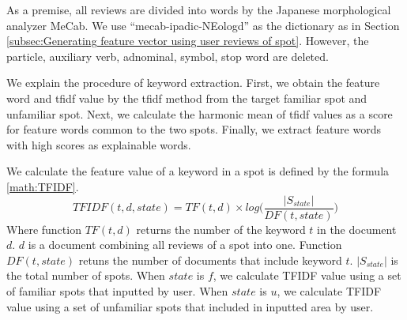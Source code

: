 \documentclass[journal]{IAENGtran}
\begin{document}
As a premise, all reviews are divided into words by the Japanese morphological analyzer MeCab. We use ``mecab-ipadic-NEologd'' as the dictionary as in Section \ref{subsec:Generating feature vector using user reviews of spot}. However, the particle, auxiliary verb, adnominal, symbol, stop word are deleted.


We explain the procedure of keyword extraction. First, we obtain the feature word and tfidf value by the tfidf method from the target familiar spot and unfamiliar spot. Next, we calculate the harmonic mean of tfidf values ​​as a score for feature words common to the two spots. Finally, we extract feature words with high scores as explainable words.

We calculate the feature value of a keyword in a spot is defined by the formula \ref{math:TFIDF}.
\begin{equation}
  TFIDF(t,d,state) = TF(t,d) \times log\Biggr(\frac{|S_{state}|}{DF(t,state)}\Biggr)
  \label{math:TFIDF}
\end{equation}
Where function $TF(t,d)$ returns the number of the keyword $t$ in the document $d$.
$d$ is a document combining all reviews of a spot into one.
Function $DF(t,state)$ retuns the number of documents that include keyword $t$.
$|S_{state}|$ is the total number of spots.
When $state$ is $f$, we calculate TFIDF value using a set of familiar spots that inputted by user.
When $state$ is $u$, we calculate TFIDF value using a set of unfamiliar spots that included in inputted area by user.
\end{document}
